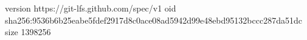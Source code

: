 version https://git-lfs.github.com/spec/v1
oid sha256:9536b6b25eabe5fdef2917d8c0ace08ad5942d99e48ebd95132bccc287da51dc
size 1398256
